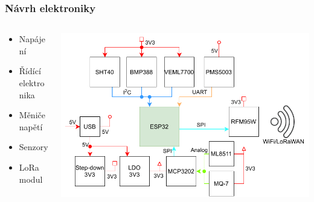 \documentclass[%
  12pt,       				%
	t,                  %
	aspectratio=1610,   %
	unicode,						%
]{beamer}				    	%
\begin{document}
\begin{frame}
	\frametitle{Návrh elektroniky}
	\begin{columns}[T]
		\begin{column}{0.4\columnwidth}
			\vspace{0.5cm}
			\begin{itemize}
				\item Napájení
				\item Řídící elektronika
				\item Měniče napětí
				\item Senzory
				\item LoRa modul
			\end{itemize}
		\end{column}

		\begin{column}{0.6\columnwidth}
			\centering
			\includegraphics[width=\columnwidth]{obrazky/block_schematic-full.drawio.pdf}
		\end{column}
	\end{columns}
\end{frame}

\end{document}
